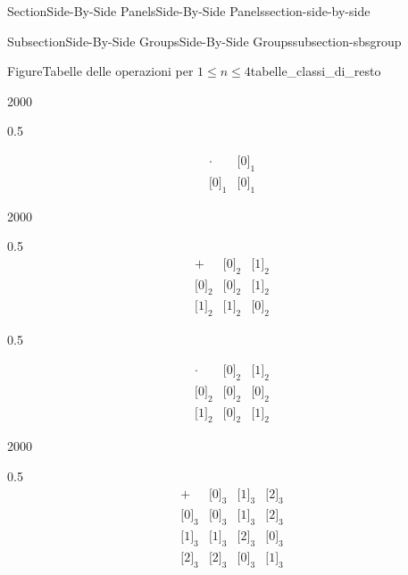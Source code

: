 \documentclass[twoside,10pt,]{article}
\numberwithin{equation}{section}
\newcommand{\class}[2][\sim]{\lbrack #2\rbrack_{#1}}
\newcommand{\amp}{&}
\begin{document}
\begin{sectionptx}{Section}{Side-By-Side Panels}{}{Side-By-Side Panels}{}{}{section-side-by-side}
\begin{subsectionptx}{Subsection}{Side-By-Side Groups}{}{Side-By-Side Groups}{}{}{subsection-sbsgroup}
\begin{figureptx}{Figure}{Tabelle delle operazioni per \(1\le n\le 4\)}{tabelle_classi_di_resto}{}
\begin{sidebyside}{2}{0}{0}{0}
\begin{sbspanel}{0.5}%
\par
%
\begin{equation*}
\begin{array}{c|c}
\cdot \amp \class[1]{0} \\
\hline
\class[1]{0} \amp \class[1]{0}
\end{array}
\end{equation*}
%
\end{sbspanel}%
\end{sidebyside}%
\begin{sidebyside}{2}{0}{0}{0}%
\begin{sbspanel}{0.5}%
%
\begin{equation*}
\begin{array}{c|cc}
+ \amp \class[2]{0} \amp \class[2]{1} \\
\hline
\class[2]{0} \amp \class[2]{0} \amp \class[2]{1}\\
\class[2]{1} \amp \class[2]{1} \amp \class[2]{0}
\end{array}
\end{equation*}
%
\end{sbspanel}%
\begin{sbspanel}{0.5}%
\par
%
\begin{equation*}
\begin{array}{c|cc}
\cdot \amp \class[2]{0} \amp \class[2]{1} \\
\hline
\class[2]{0} \amp \class[2]{0} \amp \class[2]{0}\\
\class[2]{1} \amp \class[2]{0} \amp \class[2]{1}
\end{array}
\end{equation*}
%
\end{sbspanel}%
\end{sidebyside}%
\begin{sidebyside}{2}{0}{0}{0}%
\begin{sbspanel}{0.5}%
%
\begin{equation*}
\begin{array}{c|ccc}
+ \amp \class[3]{0} \amp \class[3]{1} \amp \class[3]{2} \\
\hline
\class[3]{0} \amp \class[3]{0} \amp \class[3]{1} \amp \class[3]{2} \\
\class[3]{1} \amp \class[3]{1} \amp \class[3]{2} \amp \class[3]{0} \\
\class[3]{2} \amp \class[3]{2} \amp \class[3]{0} \amp \class[3]{1} \\
\end{array}

\end{equation*}
\end{sbspanel}
\end{sidebyside}
\end{figureptx}
\end{subsectionptx}
\end{sectionptx}
\end{document}
